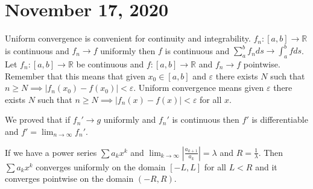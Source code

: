 \documentclass{article}
\newcommand{\R}{\mathbb{R}}
\newcommand{\eps}{\varepsilon}
\newcommand{\ra}[1][]{\xrightarrow{#1}}
\begin{document}
\section{November 17, 2020}
Uniform convergence is convenient for continuity and integrability.
$f_n:[a,b]\ra\R$ is continuous and $f_n\ra f$ uniformly then $f$ is  continuous and $\sum_a^b f_n ds\ra \int_a^b f ds$.
Let $f_n:[a,b]\ra\R$ be continuous and $f:[a,b]\ra \R$ and $f_n\ra f$ pointwise. Remember that this means that given $x_0\in [a,b]$ and $\eps$ there exists $N$ such that $n\geq N\implies |f_n(x_0)-f(x_0)|<\eps$. Uniform convergence means given $\eps$ there exists $N$ such that $n\geq N\implies |f_n(x)-f(x)|<\eps$ for all $x$.

We proved that if $f_n'\ra g$ uniformly and $f_n'$ is continuous then $f'$ is differentiable and $f'=\lim_{n\to\infty}f_n'$.
\begin{proposition}
If we have a power series $\sum a_kx^k$  and $\lim_{k\to\infty}|\frac{a_{k+1}}{a_k}|=\lambda$ and $R=\frac{1}{\lambda}$. Then $\sum a_k x^k$ converges uniformly on the domain $[-L,L]$ for all $L<R$ and it converges pointwise on the domain $(-R,R)$.
\end{proposition}
\end{document}
